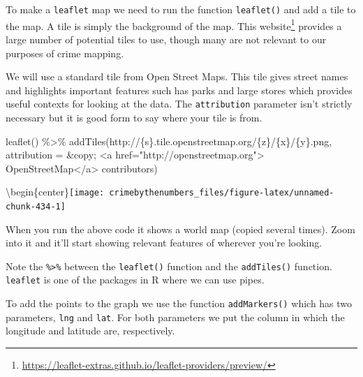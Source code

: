 \documentclass[
]{krantz}
\makeatletter
\newenvironment{Shaded}{\begin{snugshade}}{\end{snugshade}}
\newcommand{\AttributeTok}[1]{\textcolor[rgb]{0.61,0.61,0.61}{#1}}
\newcommand{\FunctionTok}[1]{\textcolor[rgb]{0,0,0}{#1}}
\newcommand{\NormalTok}[1]{#1}
\newcommand{\SpecialCharTok}[1]{\textcolor[rgb]{0,0,0}{#1}}
\newcommand{\StringTok}[1]{\textcolor[rgb]{0.5,0.5,0.5}{#1}}
\renewcommand{\href}[2]{#2\footnote{\url{#1}}}
\newenvironment{kframe}{%
\medskip{}
\setlength{\fboxsep}{.8em}
 \def\at@end@of@kframe{}%
 \ifinner\ifhmode%
  \def\at@end@of@kframe{\end{minipage}}%
  \begin{minipage}{\columnwidth}%
 \fi\fi%
 \def\FrameCommand##1{\hskip\@totalleftmargin \hskip-\fboxsep
 \colorbox{shadecolor}{##1}\hskip-\fboxsep
     \hskip-\linewidth \hskip-\@totalleftmargin \hskip\columnwidth}%
 \MakeFramed {\advance\hsize-\width
   \@totalleftmargin\z@ \linewidth\hsize
   \@setminipage}}%
 {\par\unskip\endMakeFramed%
 \at@end@of@kframe}
\renewenvironment{Shaded}{\begin{kframe}}{\end{kframe}}
\makeatother
\begin{document}
To make a \texttt{leaflet} map we need to run the function \texttt{leaflet()} and add a tile to the map. A tile is simply the background of the map. This \href{https://leaflet-extras.github.io/leaflet-providers/preview/}{website} provides a large number of potential tiles to use, though many are not relevant to our purposes of crime mapping.

We will use a standard tile from Open Street Maps. This tile gives street names and highlights important features such has parks and large stores which provides useful contexts for looking at the data. The \texttt{attribution} parameter isn't strictly necessary but it is good form to say where your tile is from.

\begin{Shaded}
\begin{Highlighting}[]
\FunctionTok{leaflet}\NormalTok{() }\SpecialCharTok{\%\textgreater{}\%} 
  \FunctionTok{addTiles}\NormalTok{(}\StringTok{\textquotesingle{}http://\{s\}.tile.openstreetmap.org/\{z\}/\{x\}/\{y\}.png\textquotesingle{}}\NormalTok{, }
           \AttributeTok{attribution =} \StringTok{\textquotesingle{}\&copy; \textless{}a href="http://openstreetmap.org"\textgreater{}}
\StringTok{                OpenStreetMap\textless{}/a\textgreater{} contributors\textquotesingle{}}\NormalTok{)}
\end{Highlighting}
\end{Shaded}

\textbackslash begin\{center\}\texttt{[image: crimebythenumbers\_files/figure-latex/unnamed-chunk-434-1]}

When you run the above code it shows a world map (copied several times). Zoom into it and it'll start showing relevant features of wherever you're looking.

Note the \texttt{\%\textgreater{}\%} between the \texttt{leaflet()} function and the \texttt{addTiles()} function. \texttt{leaflet} is one of the packages in R where we can use pipes.

To add the points to the graph we use the function \texttt{addMarkers()} which has two parameters, \texttt{lng} and \texttt{lat}. For both parameters we put the column in which the longitude and latitude are, respectively.

\begin{Shaded}
\end{Shaded}
\end{document}
